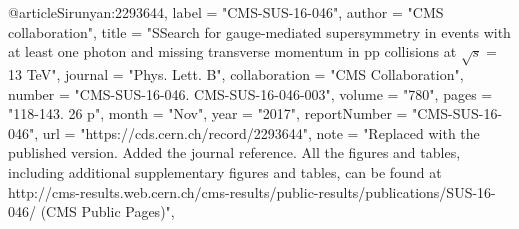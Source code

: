 @article{Sirunyan:2293644,
      label          = "CMS-SUS-16-046",
      author        = "{CMS collaboration}",
      title         = "{SSearch for gauge-mediated supersymmetry in events with
                       at least one photon and missing transverse momentum in pp
                       collisions at $\sqrt{s} = $ 13 TeV}",
      journal       = "Phys. Lett. B",
      collaboration = "CMS Collaboration",
      number        = "CMS-SUS-16-046. CMS-SUS-16-046-003",
      volume        = "780",
      pages         = "118-143. 26 p",
      month         = "Nov",
      year          = "2017",
      reportNumber  = "CMS-SUS-16-046",
      url           = "https://cds.cern.ch/record/2293644",
      note          = "Replaced with the published version. Added the journal
                       reference. All the figures and tables, including additional
                       supplementary figures and tables, can be found at
                       http://cms-results.web.cern.ch/cms-results/public-results/publications/SUS-16-046/
                       (CMS Public Pages)",
}

